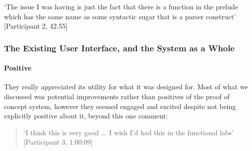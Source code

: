 `The issue I was having is just the fact that there is a function in the prelude which has the same name as some syntactic sugar that is a parser construct' [Participant 2, 42.55]

\subsubsection{The Existing User Interface, and the System as a Whole}
\paragraph{Positive}
They really appreciated its utility for what it was designed for. Most of what we discussed was potential improvements rather than positives of the proof of concept system, however they seemed engaged and excited despite not being explicitly positive about it, beyond this one comment:
    
\begin{quotation}
\noindent `I think this is very good \ldots\ I wish I'd had this in the functional labs' [Participant 3, 1:00:09]
\end{quotation} 


